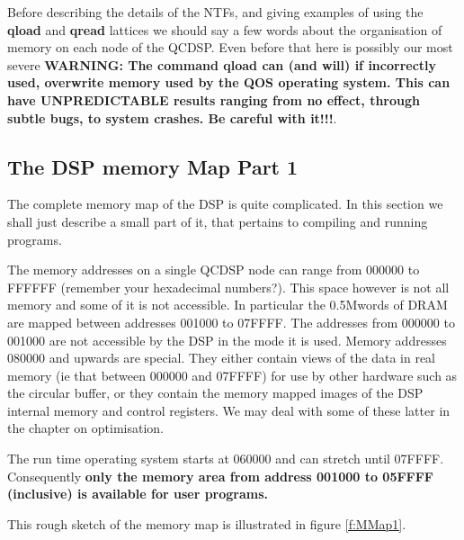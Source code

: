 Before describing the details of the NTFs, and giving examples of using
the {\bf qload} and {\bf qread} lattices we should say a few words about
the organisation of memory on each node of the QCDSP. Even before that
here is possibly our most severe {\bf WARNING: The command {\bf qload}
can (and will) if incorrectly used, overwrite memory used by  the QOS 
operating system. This can have UNPREDICTABLE results ranging from no
effect, through subtle bugs, to system crashes. Be careful with it!!!}.

\subsection{The DSP memory Map Part 1}
The complete memory map of the DSP is quite complicated. In this section
we shall just describe a small part of it, that pertains to compiling
and running programs. 

The memory addresses on a single QCDSP node can range from 000000 to 
FFFFFF (remember your hexadecimal numbers?). This space however is 
not all memory and some of it is not accessible. In particular 
the 0.5Mwords of DRAM are mapped between addresses 001000
to 07FFFF. The addresses from 000000 to 001000 are not accessible by 
the DSP in the mode it is used. Memory addresses 080000 and upwards
are special. They either contain views of the data in real memory
(ie that between 000000 and 07FFFF) for use by other hardware such
as the circular buffer, or they contain the memory mapped
images of the DSP internal memory and control registers. We may
deal with some of these latter in the chapter on optimisation.

The run time operating system starts at 060000 and can stretch
until 07FFFF. Consequently {\bf only the memory area from address
001000 to 05FFFF (inclusive) is available for user programs.}

This rough sketch of the memory map is illustrated in figure 
\ref{f:MMap1}.

